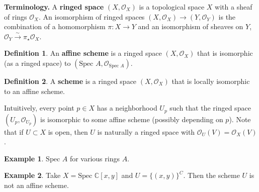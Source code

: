 \documentclass{article}
\theoremstyle{definition}
\newtheorem{example}{Example}[section]
\newtheorem{defn}{Definition}[section]
\begin{document}
\textbf{Terminology.} A \textbf{ringed space} $(X, \mathcal{O}_X)$ is a topological space $X$ with a sheaf of rings $\mathcal{O}_X$. An isomorphism of ringed spaces $(X, \mathcal{O}_X) \to (Y, \mathcal{O}_Y)$ is the combination of a homomorphism $\pi : X \to Y$ and an isomorphism of sheaves on $Y$, $\mathcal{O}_Y \stackrel{\sim}{\to} \pi_{\star}\mathcal{O}_X$.

\begin{defn}
    An \textbf{affine scheme} is a ringed space $(X, \mathcal{O}_X)$ that is isomorphic (as a ringed space) to $(\text{Spec }A, \mathcal{O}_{\text{Spec }A})$.
\end{defn}
\begin{defn}
    A \textbf{scheme} is a ringed space $(X, \mathcal{O}_X)$ that is locally isomorphic to an affine scheme.
\end{defn}
Intuitively, every point $p \in X$ has a neighborhood $U_p$ such that the ringed space $(U_p, \mathcal{O}_{U_p})$ is isomorphic to some affine scheme (possibly depending on $p$).
Note that if $U \subset X$ is open, then $U$ is naturally a ringed space with $\mathcal{O}_U(V) = \mathcal{O}_X(V)$.

\begin{example}
    $\text{Spec }A$ for various rings $A$.
\end{example}
\begin{example}
    Take $X = \text{Spec }\mathbb{C}[x,y]$ and $U = \{(x,y)\}^C$. Then the scheme $U$ is not an affine scheme.
\end{example}
\end{document}
